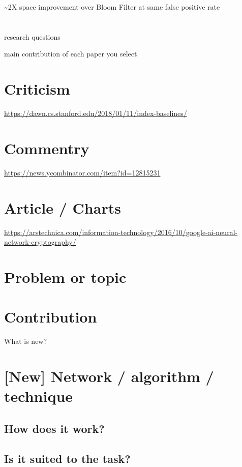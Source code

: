 \documentclass[11pt]{article}
\begin{document}
\textasciitilde{}2X space improvement over
Bloom Filter at same false positive rate


\section{}
\label{sec:org8e154bc}
research  questions

main contribution of each paper you
select


\section{Criticism}
\label{sec:org6b7755d}
\url{https://dawn.cs.stanford.edu/2018/01/11/index-baselines/}

\section{Commentry}
\label{sec:org140fcb6}
\url{https://news.ycombinator.com/item?id=12815231}

\section{Article / Charts}
\label{sec:org1c330dc}
\url{https://arstechnica.com/information-technology/2016/10/google-ai-neural-network-cryptography/}



\section{Problem or topic}
\label{sec:org4adbb35}

\section{Contribution}
\label{sec:org1a47471}
What is new?

\section{[New] Network / algorithm / technique}
\label{sec:orge5ccae2}
\subsection{How does it work?}
\label{sec:orge0215a8}
\subsection{Is it suited to the task?}
\label{sec:org6cb337e}
\end{document}
